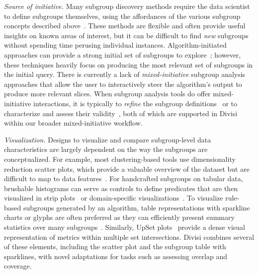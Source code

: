 \textit{Source of initiative.} Many subgroup discovery methods require the data scientist to define subgroups themselves, using the affordances of the various subgroup concepts described above~\cite{cabrera_zeno_2023,wu_errudite_2020,kwon_rmexplorer_2022}. 
These methods are flexible and often provide useful insights on known areas of interest, but it can be difficult to find \textit{new} subgroups without spending time perusing individual instances. 
Algorithm-initiated approaches can provide a strong initial set of subgroups to explore~\cite{chung_slice_2020,zhang_sliceteller_2022}; however, these techniques heavily focus on producing the most relevant set of subgroups in the initial query.
There is currently a lack of \textit{mixed-initiative} subgroup analysis approaches that allow the user to interactively steer the algorithm's output to produce more relevant slices.
When subgroup analysis tools do offer mixed-initiative interactions, it is typically to \textit{refine} the subgroup definitions~\cite{slyman_vlslice_2023} or to characterize and assess their validity~\cite{hurley_interactive_2022}, both of which are supported in Divisi within our broader mixed-initiative workflow.

\textit{Visualization.} Designs to visualize and compare subgroup-level data characteristics are largely dependent on the way the subgroups are conceptualized.
For example, most clustering-based tools use dimensionality reduction scatter plots, which provide a valuable overview of the dataset but are difficult to map to data features~\cite{Liu2019,slyman_vlslice_2023,xuan_attributionscanner_2024,suresh_kaleidoscope_2023,sivaraman_emblaze_2022}.
For handcrafted subgroups on tabular data, brushable histograms can serve as controls to define predicates that are then visualized in strip plots~\cite{cabrera_fairvis_2019} or domain-specific visualizations~\cite{kwon_rmexplorer_2022}.
To visualize rule-based subgroups generated by an algorithm, table representations with sparkline charts or glyphs are often preferred as they can efficiently present summary statistics over many subgroups~\cite{kahng_visual_2016,kerrigan_slicelens_2023,zhang_sliceteller_2022}.
Similarly, UpSet plots~\cite{2014_infovis_upset} provide a dense visual representation of metrics within multiple set intersections.
Divisi combines several of these elements, including the scatter plot and the subgroup table with sparklines, with novel adaptations for tasks such as assessing overlap and coverage.


